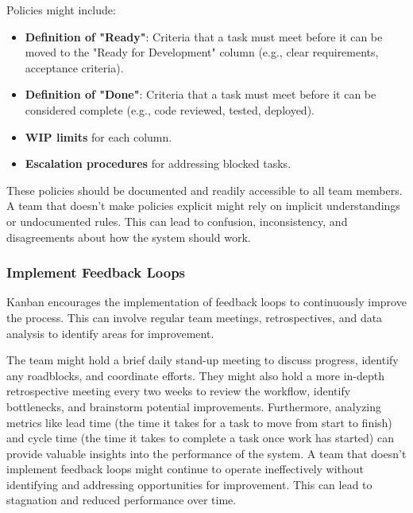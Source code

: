 \begin{examplecountercard}
  Policies might include:

  \begin{itemize}
    \item \textbf{Definition of "Ready"}: Criteria that a task must meet before it can be moved to the "Ready for Development" column (e.g., clear requirements, acceptance criteria).
    \item \textbf{Definition of "Done"}: Criteria that a task must meet before it can be considered complete (e.g., code reviewed, tested, deployed).
    \item \textbf{WIP limits} for each column.
    \item \textbf{Escalation procedures} for addressing blocked tasks.
  \end{itemize}

  These policies should be documented and readily accessible to all team members.
  \tcblower A team that doesn't make policies explicit might rely on implicit
  understandings or undocumented rules. This can lead to confusion,
  inconsistency, and disagreements about how the system should work.
\end{examplecountercard}

\subsubsection{Implement Feedback Loops}

Kanban encourages the implementation of feedback loops to continuously improve
the process. This can involve regular team meetings, retrospectives, and data
analysis to identify areas for improvement.

\begin{examplecountercard}
  The team might hold a brief daily stand-up meeting to discuss progress, identify any roadblocks, and coordinate efforts. They might also hold a more in-depth retrospective meeting every two weeks to review the workflow, identify bottlenecks, and brainstorm potential improvements. Furthermore, analyzing metrics like lead time (the time it takes for a task to move from start to finish) and cycle time (the time it takes to complete a task once work has started) can provide valuable insights into the performance of the system.
  \tcblower
  A team that doesn't implement feedback loops might continue to operate ineffectively without identifying and addressing opportunities for improvement. This can lead to stagnation and reduced performance over time.
\end{examplecountercard}

